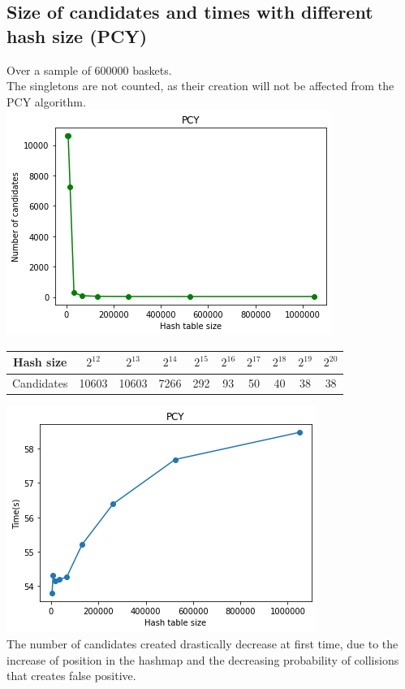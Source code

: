 \documentclass[14pt]{extarticle}
\begin{document}
\subsection{Size of candidates and times with different hash size (PCY)}
Over a sample of 600000 baskets.\\
The singletons are not counted, as their creation will not be affected from the PCY algorithm.\\
\includegraphics[scale=1]{size_by_hsize.png}\\
\begin{center}
\begin{tabular}{ |c||c|c|c|c|c|c|c|c|c| } 
 \hline
 Hash size & $2^{12}$ & $2^{13}$ & $2^{14}$ & $2^{15}$ & $2^{16}$ & $2^{17}$ & $2^{18}$ & $2^{19}$ & $2^{20}$ \\
 \hline
 Candidates & 10603 & 10603 & 7266 & 292 & 93 & 50 & 40 & 38 & 38\\
 \hline
\end{tabular}
\end{center}
\includegraphics[scale=1]{pcy_hsize_time.png}\\
The number of candidates created drastically decrease at first time, due to the increase of position in the hashmap and the decreasing probability of collisions that creates false positive.\\
\end{document}
